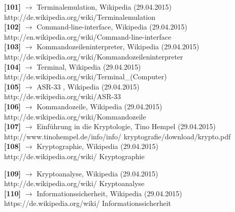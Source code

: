 \documentclass[12pt,a4paper]{report}
\begin{document}
\begin{onehalfspace}
\noindent
\textbf{[101]} $\rightarrow$ Terminalemulation, Wikipedia (29.04.2015)\\
http://de.wikipedia.org/wiki/Terminalemulation\\

\noindent
\textbf{[102]} $\rightarrow$ Command-line-interface, Wikipedia (29.04.2015)\\
http://en.wikipedia.org/wiki/Command-line-interface\\

\noindent
\textbf{[103]} $\rightarrow$ Kommandozeileninterpreter, Wikipedia (29.04.2015)\\
http://de.wikipedia.org/wiki/Kommandozeileninterpreter\\

\noindent
\textbf{[104]} $\rightarrow$ Terminal, Wikipedia (29.04.2015)\\
http://de.wikipedia.org/wiki/Terminal\_(Computer)\\

\noindent
\textbf{[105]} $\rightarrow$ ASR-33 , Wikipedia (29.04.2015)\\
http://de.wikipedia.org/wiki/ASR-33\\

\noindent
\textbf{[106]} $\rightarrow$ Kommandozeile, Wikipedia (29.04.2015)\\
http://de.wikipedia.org/wiki/Kommandozeile\\

\noindent
\textbf{[107]} $\rightarrow$ Einführung in die
Kryptologie, Tino Hempel (29.04.2015)\\
http://www.tinohempel.de/info/info/ kryptografie/download/krypto.pdf\\

\noindent
\textbf{[108]} $\rightarrow$ Kryptographie, Wikipedia (29.04.2015)\\
http://de.wikipedia.org/wiki/ Kryptographie\\

\newpage

\noindent
\textbf{[109]} $\rightarrow$ Kryptoanalyse, Wikipedia (29.04.2015)\\
http://de.wikipedia.org/wiki/ Kryptoanalyse\\

\noindent
\textbf{[110]} $\rightarrow$ Informationssicherheit, Wikipedia (29.04.2015)\\
https://de.wikipedia.org/wiki/ Informationssicherheit\\


\end{onehalfspace}
\end{document}
